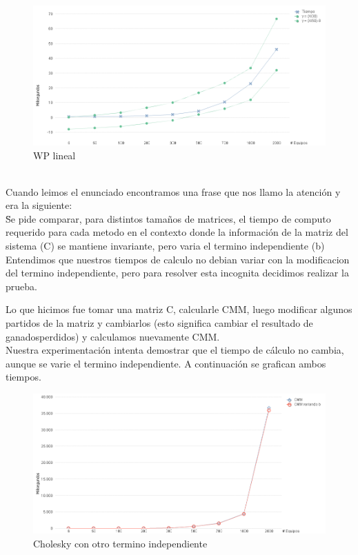 \begin{figure}[H]
\centering
\includegraphics[width=1\textwidth]{IMG/wp lineal.png}
\caption{WP lineal}
\label{fig:WP lineal}
\end{figure}

\\


Cuando leimos el enunciado encontramos una frase que nos llamo la atención y era la siguiente: \\

\"Se pide comparar, para distintos tamaños de matrices, el tiempo de computo requerido para cada metodo en el contexto donde la información de la matriz del sistema (C) se mantiene invariante, 
pero varia el termino independiente (b)\"\\

Entendimos que nuestros tiempos de calculo no debian variar con la modificacion del termino independiente, pero para resolver esta incognita decidimos realizar la prueba.

Lo que hicimos fue tomar una matriz C, calcularle CMM, luego modificar algunos partidos de la matriz y cambiarlos (esto significa cambiar el resultado de ganados\/perdidos) y calculamos 
nuevamente CMM. \\

Nuestra experimentación intenta demostrar que el tiempo de cálculo no cambia, aunque se varie el termino independiente.
A continuación se grafican ambos tiempos.\\

\begin{figure}[H]
\centering
\includegraphics[width=1\textwidth]{IMG/Cholesky con otro termino independiente.png}
\caption{Cholesky con otro termino independiente}
\label{fig:Cholesky con otro termino independiente}
\end{figure}
